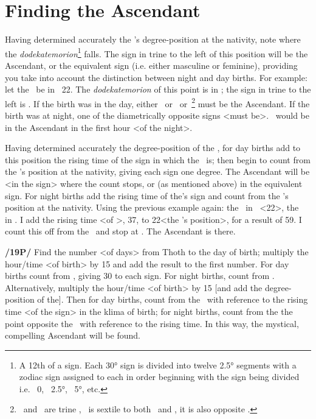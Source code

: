 \section{Finding the Ascendant}
Having determined accurately the \Sun’s degree-position at the nativity, note where the \textsl{dodekatemorion}\footnote{A 12th of a sign. Each 30° sign is divided into twelve 2.5° segments with a zodiac sign assigned to each in order beginning with the sign being divided i.e. \Aries\, 0, \Taurus\, 2.5°, \Gemini\, 5°, etc.} falls. The sign in trine to the left of this position will be the Ascendant, or the equivalent sign (i.e. either masculine or feminine), providing you take into account the distinction between night and day births. For example: let the \Sun\, be in \Aquarius\, 22\deg. The \textsl{dodekatemorion} of this point is in \Scorpio; the sign in trine to the left is \Pisces. If the birth was in the day, either \Pisces\, or \Taurus\, or \Cancer\,\footnote{\Pisces\, and \Cancer\, are trine \Scorpio, \Taurus\, is sextile to both \Pisces\, and \Cancer, it is also opposite \Scorpio.} must be the Ascendant. If the birth was at night, one of the diametrically opposite signs <must be>. \Virgo\, would be in the Ascendant in the first hour <of the night>.

Having determined accurately the degree-position of the \Sun, for day births add to this position the rising time of the sign in which the \Sun\, is; then begin to count from the \Moon’s position at the nativity, giving each sign one degree. The Ascendant will be <in the sign> where the count stops, or (as mentioned above) in the equivalent sign. For night births add the rising time of the\Moon’s sign and count from the \Sun’s position at the nativity. Using the previous example again: the \Sun\, in \Aquarius\, <22\deg>, the \Moon\, in
\Scorpio. I add the rising time <of \Scorpio>, 37, to 22\deg <the \Sun’s position>, for a result of 59. I count this off from the \Sun\, and stop at \Virgo. The Ascendant is there.

\textbf{/19P/} Find the number <of days> from Thoth to the day of birth; multiply the hour/time <of birth> by 15 and add the result to the first number. For day births count from \Virgo, giving 30 to each sign. For night births, count from \Pisces.
Alternatively, multiply the hour/time <of birth> by 15 [and add the degree-position of the\Sun]. Then for day births, count from the \Sun\, with reference to the rising time <of the sign> in the klima of birth; for night births, count from the the point opposite the \Sun\, with reference to the rising time. In this way, the mystical, compelling Ascendant will be found. 

